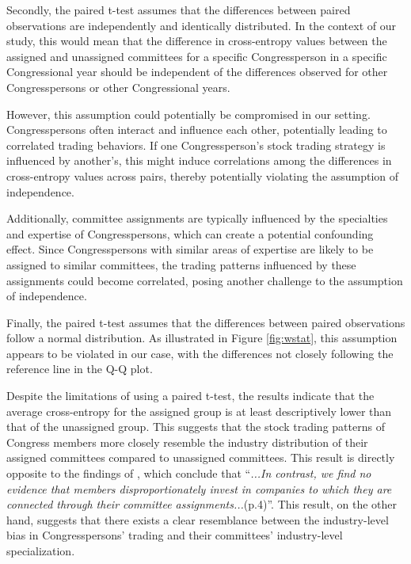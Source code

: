\documentclass[15pt,letterpaper]{article}
\begin{document}
Secondly, the paired t-test assumes that the differences between paired observations are independently and identically distributed. In the context of our study, this would mean that the difference in cross-entropy values between the assigned and unassigned committees for a specific Congressperson in a specific Congressional year should be independent of the differences observed for other Congresspersons or other Congressional years.

However, this assumption could potentially be compromised in our setting. Congresspersons often interact and influence each other, potentially leading to correlated trading behaviors. If one Congressperson's stock trading strategy is influenced by another's, this might induce correlations among the differences in cross-entropy values across pairs, thereby potentially violating the assumption of independence.

Additionally, committee assignments are typically influenced by the specialties and expertise of Congresspersons, which can create a potential confounding effect. Since Congresspersons with similar areas of expertise are likely to be assigned to similar committees, the trading patterns influenced by these assignments could become correlated, posing another challenge to the assumption of independence.

Finally, the paired t-test assumes that the differences between paired observations follow a normal distribution. As illustrated in Figure \ref{fig:wstat}, this assumption appears to be violated in our case, with the differences not closely following the reference line in the Q-Q plot.



Despite the limitations of using a paired t-test, the results indicate that the average cross-entropy for the assigned group is at least descriptively lower than that of the unassigned group. This suggests that the stock trading patterns of Congress members more closely resemble the industry distribution of their assigned committees compared to unassigned committees.
This result is directly opposite to the findings of \cite{eg14}, which conclude that ``\textit{...In contrast, we find no evidence that members disproportionately invest in companies to which they are connected through their committee assignments...}(p.4)''. 
This result, on the other hand, suggests that there exists a clear resemblance between the industry-level bias in Congresspersons' trading and their committees' industry-level specialization.
\end{document}

